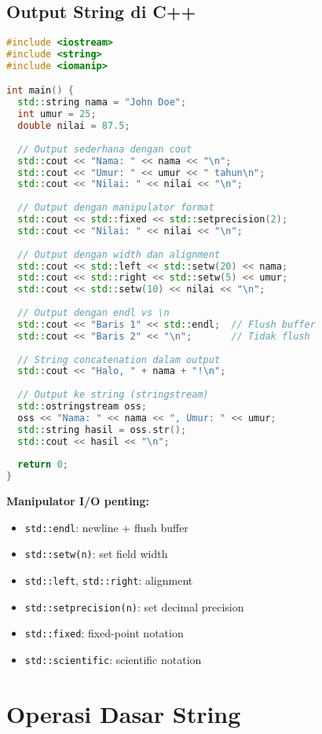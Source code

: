 \documentclass[../main.tex]{subfiles}
\begin{document}
\subsection{Output String di C++}

\begin{lstlisting}[language=C++, caption={Output string di C++}]
#include <iostream>
#include <string>
#include <iomanip>

int main() {
  std::string nama = "John Doe";
  int umur = 25;
  double nilai = 87.5;
  
  // Output sederhana dengan cout
  std::cout << "Nama: " << nama << "\n";
  std::cout << "Umur: " << umur << " tahun\n";
  std::cout << "Nilai: " << nilai << "\n";
  
  // Output dengan manipulator format
  std::cout << std::fixed << std::setprecision(2);
  std::cout << "Nilai: " << nilai << "\n";
  
  // Output dengan width dan alignment
  std::cout << std::left << std::setw(20) << nama;
  std::cout << std::right << std::setw(5) << umur;
  std::cout << std::setw(10) << nilai << "\n";
  
  // Output dengan endl vs \n
  std::cout << "Baris 1" << std::endl;  // Flush buffer
  std::cout << "Baris 2" << "\n";       // Tidak flush
  
  // String concatenation dalam output
  std::cout << "Halo, " + nama + "!\n";
  
  // Output ke string (stringstream)
  std::ostringstream oss;
  oss << "Nama: " << nama << ", Umur: " << umur;
  std::string hasil = oss.str();
  std::cout << hasil << "\n";
  
  return 0;
}
\end{lstlisting}

\textbf{Manipulator I/O penting:}
\begin{itemize}
  \item \texttt{std::endl}: newline + flush buffer
  \item \texttt{std::setw(n)}: set field width
  \item \texttt{std::left}, \texttt{std::right}: alignment
  \item \texttt{std::setprecision(n)}: set decimal precision
  \item \texttt{std::fixed}: fixed-point notation
  \item \texttt{std::scientific}: scientific notation
\end{itemize}

\section{Operasi Dasar String}
\end{document}
